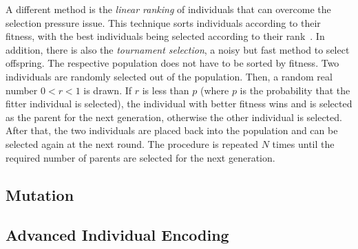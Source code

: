 \documentclass[paper=a4,%
  twoside,%
  BCOR4mm,%
  abstract=true,%
  toc=bibliography,%
  chapterprefix=true,%
  toc=bibliographynumbered,%
  open=right,%
  english,%
  pagesize=pdftex]{scrreprt}
\begin{document}
A different method is the \textit{linear ranking} of individuals that can overcome the selection pressure issue. This technique sorts individuals according to their fitness, with the best individuals being selected according to their rank~\cite{whitley1989genitor}. In addition, there is also the \textit{tournament selection}, a noisy but fast method to select offspring. The respective population does not have to be sorted by fitness. Two individuals are randomly selected out of the population. Then, a random real number $0 < r < 1$ is drawn. If $r$ is less than $p$ (where $p$ is the probability that the fitter individual is selected), the individual with better fitness wins and is selected as the parent for the next generation, otherwise the other individual is selected. After that, the two individuals are placed back into the population and can be selected again at the next round. The procedure is repeated $N$ times until the required number of parents are selected for the next generation.

\subsection{Mutation}

\subsection{Advanced Individual Encoding}
\end{document}
